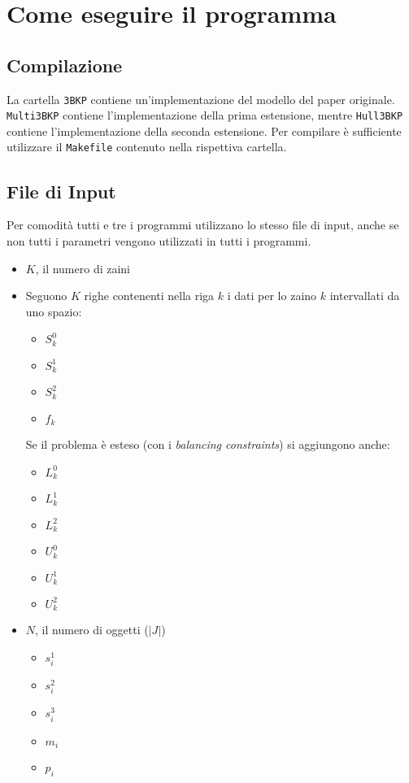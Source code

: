 \section{Come eseguire il programma}
\subsection{Compilazione}
La cartella \verb|3BKP| contiene un'implementazione del modello del paper originale.
\verb|Multi3BKP| contiene l'implementazione della prima estensione, 
mentre \verb|Hull3BKP| contiene l'implementazione della seconda estensione.
Per compilare è sufficiente utilizzare il \verb|Makefile| contenuto nella 
rispettiva cartella.


\subsection{File di Input}
Per comodità tutti e tre i programmi utilizzano lo stesso file di input, anche se 
non tutti i parametri vengono utilizzati in tutti i programmi.
\begin{itemize}
	\item $K$, il numero di zaini
	\item Seguono $K$ righe contenenti nella riga $k$ i dati per lo zaino $k$ 
	intervallati da uno spazio:
	\begin{itemize}
		\item $S_k^0$
		\item $S_k^1$
		\item $S_k^2$
		\item $f_k$
	\end{itemize} 
	Se il problema è esteso (con i \emph{balancing constraints}) si 
	aggiungono anche:
	\begin{itemize}
		\item $L_k^0$
		\item $L_k^1$
		\item $L_k^2$
		\item $U_k^0$
		\item $U_k^1$
		\item $U_k^2$
	\end{itemize}
	\item $N$, il numero di oggetti ($|J|$)
	\begin{itemize}
		\item $s_i^1$
		\item $s_i^2$
		\item $s_i^3$
		\item $m_i$
		\item $p_i$
	\end{itemize}
\end{itemize}

